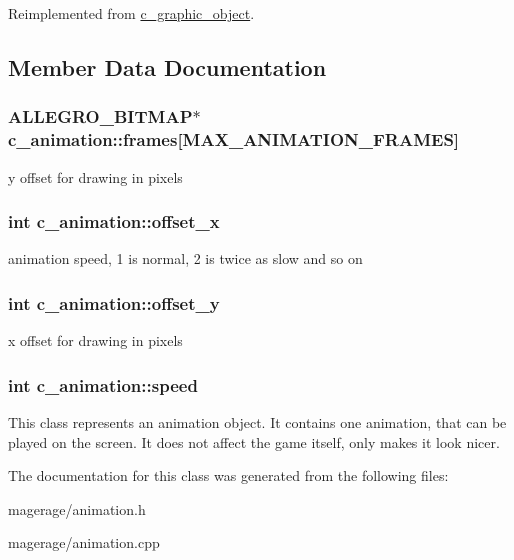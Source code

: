 Reimplemented from \hyperlink{classc__graphic__object_a94ef8137eed9ce1ae7adf366fefb51cf}{c\-\_\-graphic\-\_\-object}.



\subsection{Member Data Documentation}
\hypertarget{classc__animation_ad881d6653de035e33a8b0ad3e0c178a5}{
\subsubsection[{frames}]{\setlength{\rightskip}{0pt plus 5cm}A\-L\-L\-E\-G\-R\-O\-\_\-\-B\-I\-T\-M\-A\-P$\ast$ c\-\_\-animation\-::frames\mbox{[}M\-A\-X\-\_\-\-A\-N\-I\-M\-A\-T\-I\-O\-N\-\_\-\-F\-R\-A\-M\-E\-S\mbox{]}\hspace{0.3cm}{\ttfamily [protected]}}}\label{classc__animation_ad881d6653de035e33a8b0ad3e0c178a5}
y offset for drawing in pixels \hypertarget{classc__animation_a94a4d0e669cf48082e293c8d811e5ca4}{
\subsubsection[{offset\-\_\-x}]{\setlength{\rightskip}{0pt plus 5cm}int c\-\_\-animation\-::offset\-\_\-x\hspace{0.3cm}{\ttfamily [protected]}}}\label{classc__animation_a94a4d0e669cf48082e293c8d811e5ca4}
animation speed, 1 is normal, 2 is twice as slow and so on \hypertarget{classc__animation_acb05e62189bcbac633c9290016c25415}{
\subsubsection[{offset\-\_\-y}]{\setlength{\rightskip}{0pt plus 5cm}int c\-\_\-animation\-::offset\-\_\-y\hspace{0.3cm}{\ttfamily [protected]}}}\label{classc__animation_acb05e62189bcbac633c9290016c25415}
x offset for drawing in pixels \hypertarget{classc__animation_acbb0e4a3a678ecf74b91e23c22eaa29a}{
\subsubsection[{speed}]{\setlength{\rightskip}{0pt plus 5cm}int c\-\_\-animation\-::speed\hspace{0.3cm}{\ttfamily [protected]}}}\label{classc__animation_acbb0e4a3a678ecf74b91e23c22eaa29a}
This class represents an animation object. It contains one animation, that can be played on the screen. It does not affect the game itself, only makes it look nicer. 

The documentation for this class was generated from the following files\-:\begin{DoxyCompactItemize}
\item 
magerage/animation.\-h\item 
magerage/animation.\-cpp\end{DoxyCompactItemize}
